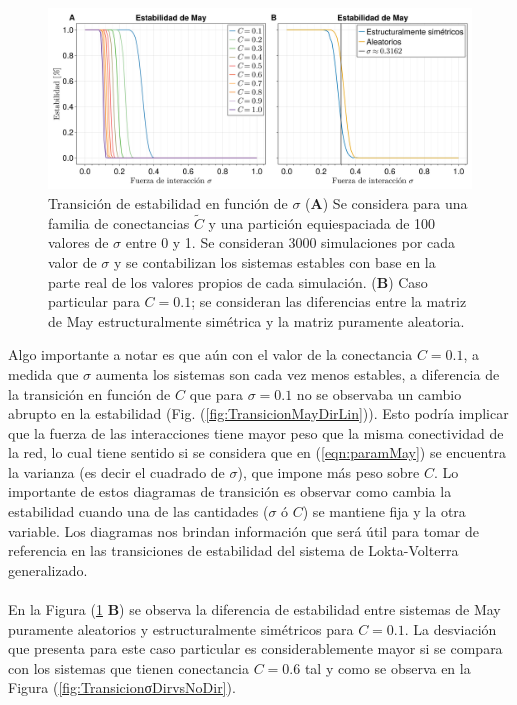 \begin{figure}[h!]
	\centering
	\includegraphics[scale = 0.165]{../Imagenes/TransicionMaySigma}
	\caption{Transición de estabilidad en función de $\sigma$ (\textbf{A}) Se considera para una familia de conectancias $\tilde{C}$ y una partición equiespaciada de 100 valores de $\sigma$ entre 0 y 1. Se consideran 3000 simulaciones por cada valor de $\sigma$ y se contabilizan los sistemas estables con base en la parte real de los valores propios de cada simulación. (\textbf{B}) Caso particular para $C=0.1$; se consideran las diferencias entre la matriz de May estructuralmente simétrica y la matriz puramente aleatoria.}
	\label{fig:TransicionMaySigma}
\end{figure}
Algo importante a notar es que aún con el valor de la conectancia $C=0.1$, a medida que $\sigma$ aumenta los sistemas son cada vez menos estables, a diferencia de la transición en función de $C$ que para $\sigma=0.1$ no se observaba un cambio abrupto en la estabilidad (Fig. (\ref{fig:TransicionMayDirLin})). Esto podría implicar que la fuerza de las interacciones tiene mayor peso que la misma conectividad de la red, lo cual tiene sentido si se considera que en (\ref{eqn:paramMay}) se encuentra la varianza (es decir el cuadrado de $\sigma$), que impone más peso sobre $C$. Lo importante de estos diagramas de transición es observar como cambia la estabilidad cuando una de las cantidades ($\sigma$ ó $C$) se mantiene fija y la otra variable. Los diagramas nos brindan información que será útil para tomar de referencia en las transiciones de estabilidad del sistema de Lokta-Volterra generalizado.\\
\\
En la Figura (\ref{fig:TransicionMaySigma} \textbf{B}) se observa la diferencia de estabilidad entre sistemas de May puramente aleatorios y estructuralmente simétricos para $C=0.1$. La desviación que presenta para este caso particular es considerablemente mayor si se compara con los sistemas que tienen conectancia $C=0.6$ tal y como se observa en la Figura (\ref{fig:TransicionσDirvsNoDir}).
